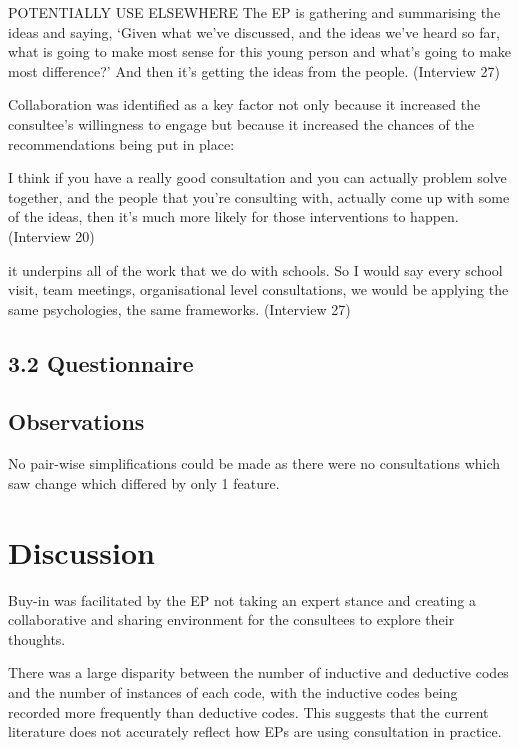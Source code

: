 \documentclass[
  english,
  man]{apa}
\let\oldparagraph\paragraph
\renewcommand{\paragraph}[1]{\oldparagraph{#1}\mbox{}}
\begin{document}
POTENTIALLY USE ELSEWHERE The EP is gathering and summarising the ideas
and saying, `Given what we've discussed, and the ideas we've heard so
far, what is going to make most sense for this young person and what's
going to make most difference?' And then it's getting the ideas from the
people. (Interview 27)

Collaboration was identified as a key factor not only because it
increased the consultee's willingness to engage but because it increased
the chances of the recommendations being put in place:

I think if you have a really good consultation and you can actually
problem solve together, and the people that you're consulting with,
actually come up with some of the ideas, then it's much more likely for
those interventions to happen. (Interview 20)

it underpins all of the work that we do with schools. So I would say
every school visit, team meetings, organisational level consultations,
we would be applying the same psychologies, the same frameworks.
(Interview 27)

\hypertarget{section}{%
\paragraph{}\label{section}}

\hypertarget{questionnaire-3}{%
\subsection{3.2 Questionnaire}\label{questionnaire-3}}

\hypertarget{observations}{%
\subsection{Observations}\label{observations}}

No pair-wise simplifications could be made as there were no
consultations which saw change which differed by only 1 feature.

\hypertarget{discussion}{%
\section{Discussion}\label{discussion}}

Buy-in was facilitated by the EP not taking an expert stance and
creating a collaborative and sharing environment for the consultees to
explore their thoughts.

There was a large disparity between the number of inductive and deductive codes and the number of instances of each code, with the inductive codes being recorded more frequently than deductive codes. This suggests that the current literature does not accurately reflect how EPs are using consultation in practice.
\end{document}
